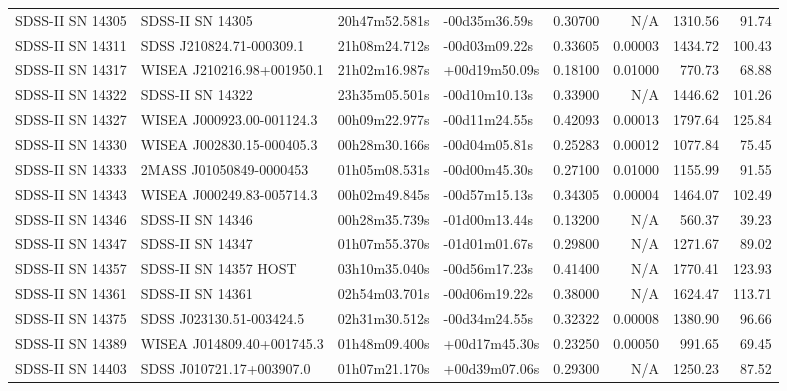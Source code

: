 \begin{longtable}{llllrrrr}
SDSS-II SN 14305 &                SDSS-II SN 14305 &   20h47m52.581s &   -00d35m36.59s &  0.30700 &      N/A &  1310.56 &       91.74 \\
SDSS-II SN 14311 &        SDSS J210824.71-000309.1 &   21h08m24.712s &   -00d03m09.22s &  0.33605 &  0.00003 &  1434.72 &      100.43 \\
SDSS-II SN 14317 &       WISEA J210216.98+001950.1 &   21h02m16.987s &   +00d19m50.09s &  0.18100 &  0.01000 &   770.73 &       68.88 \\
SDSS-II SN 14322 &                SDSS-II SN 14322 &   23h35m05.501s &   -00d10m10.13s &  0.33900 &      N/A &  1446.62 &      101.26 \\
SDSS-II SN 14327 &       WISEA J000923.00-001124.3 &   00h09m22.977s &   -00d11m24.55s &  0.42093 &  0.00013 &  1797.64 &      125.84 \\
SDSS-II SN 14330 &       WISEA J002830.15-000405.3 &   00h28m30.166s &   -00d04m05.81s &  0.25283 &  0.00012 &  1077.84 &       75.45 \\
SDSS-II SN 14333 &         2MASS J01050849-0000453 &   01h05m08.531s &   -00d00m45.30s &  0.27100 &  0.01000 &  1155.99 &       91.55 \\
SDSS-II SN 14343 &       WISEA J000249.83-005714.3 &   00h02m49.845s &   -00d57m15.13s &  0.34305 &  0.00004 &  1464.07 &      102.49 \\
SDSS-II SN 14346 &                SDSS-II SN 14346 &   00h28m35.739s &   -01d00m13.44s &  0.13200 &      N/A &   560.37 &       39.23 \\
SDSS-II SN 14347 &                SDSS-II SN 14347 &   01h07m55.370s &   -01d01m01.67s &  0.29800 &      N/A &  1271.67 &       89.02 \\
SDSS-II SN 14357 &           SDSS-II SN 14357 HOST &   03h10m35.040s &   -00d56m17.23s &  0.41400 &      N/A &  1770.41 &      123.93 \\
SDSS-II SN 14361 &                SDSS-II SN 14361 &   02h54m03.701s &   -00d06m19.22s &  0.38000 &      N/A &  1624.47 &      113.71 \\
SDSS-II SN 14375 &        SDSS J023130.51-003424.5 &   02h31m30.512s &   -00d34m24.55s &  0.32322 &  0.00008 &  1380.90 &       96.66 \\
SDSS-II SN 14389 &       WISEA J014809.40+001745.3 &   01h48m09.400s &   +00d17m45.30s &  0.23250 &  0.00050 &   991.65 &       69.45 \\
SDSS-II SN 14403 &        SDSS J010721.17+003907.0 &   01h07m21.170s &   +00d39m07.06s &  0.29300 &      N/A &  1250.23 &       87.52 \\

\end{longtable}
